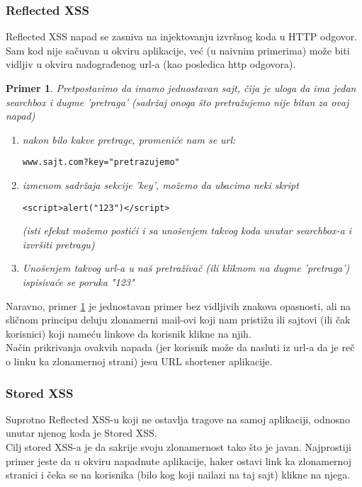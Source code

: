 \documentclass[a4paper]{article}
\newtheorem{primer}{Primer}[section]
\begin{document}
\subsubsection{Reflected XSS}

Reflected XSS napad se zasniva na injektovanju izvršnog koda u HTTP odgovor. Sam kod nije sačuvan u okviru aplikacije, već (u naivnim primerima) može biti vidljiv u okviru nadograđenog url-a (kao posledica http odgovora).
\begin{primer}
\label{primer1}
Pretpostavimo da imamo jednostavan sajt, čija je uloga da ima jedan searchbox i dugme 'pretraga' (sadržaj onoga što pretražujemo nije bitan za ovaj napad)
\begin{enumerate}
\item nakon bilo kakve pretrage, promeniće nam se url: 
\begin{lstlisting}
www.sajt.com?key="pretrazujemo"
\end{lstlisting}
\item izmenom sadržaja sekcije 'key', možemo da ubacimo neki skript

\begin{lstlisting}
<script>alert("123")</script>
\end{lstlisting}

(isti efekat možemo postići i sa unošenjem takvog koda unutar searchbox-a i izvršiti pretragu)
\item Unošenjem takvog url-a u naš pretraživač (ili kliknom na dugme 'pretraga') ispisivaće se poruka "123"\\

\end{enumerate}
\end{primer}

 Naravno, primer \ref{primer1} je jednostavan primer bez vidljivih znakova opasnosti, ali na sličnom principu deluju zlonamerni mail-ovi koji nam pristižu ili sajtovi (ili čak korisnici) koji nameću linkove da korisnik klikne na njih.\\
Način prikrivanja ovakvih napada (jer korisnik može da nasluti iz url-a da je reč o linku ka zlonamernoj strani) jesu URL shortener aplikacije.

\subsubsection{Stored XSS}

Suprotno Reflected XSS-u koji ne ostavlja tragove na samoj aplikaciji, odnosno unutar njenog koda je Stored XSS.\\ Cilj stored XSS-a je da sakrije svoju zlonamernost tako što je javan. Najprostiji primer jeste da u okviru napadnute aplikacije, haker ostavi link ka zlonamernoj stranici i čeka se na korisnika (bilo kog koji nailazi na taj sajt) klikne na njega.
\end{document}
